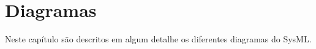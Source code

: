 \documentclass[ruledheader,noindentfirst,anapcustomindent,abntfigtabnum,tocpage=plain]{def_and_cls/abnt}
\begin{document}
%
%
\renewcommand{\rmdefault}{phv}      %
%
%
%

%

%
%
%
%
%
\pagestyle{plain}%
%
%

%
\tableofcontents



%
\pagestyle{fancy}

%
\renewcommand{\chaptermark}[1]{\markboth{#1}{}}
\renewcommand{\sectionmark}[1]{\markright{\thesection\ #1}}







\chapter{Diagramas}
\label{CAP2}

Neste capítulo são descritos em algum detalhe os diferentes diagramas do SysML. 









\apendice
%
\end{document}
